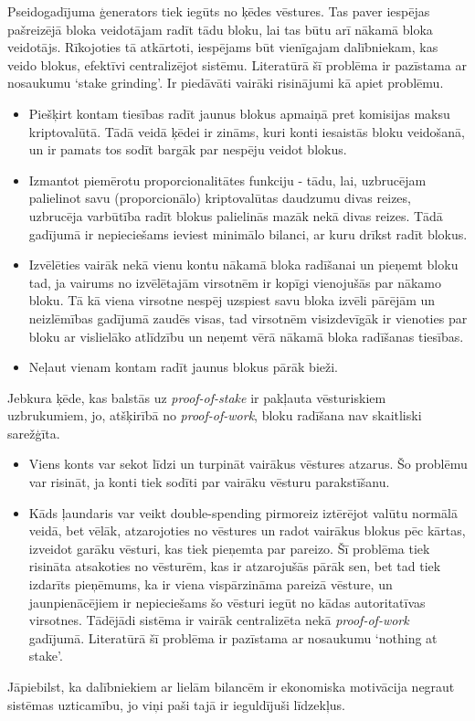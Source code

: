 Pseidogadījuma ģenerators tiek iegūts no ķēdes vēstures. Tas paver iespējas pašreizējā bloka veidotājam radīt tādu bloku, lai tas būtu arī nākamā bloka veidotājs. Rīkojoties tā atkārtoti, iespējams būt vienīgajam dalībniekam, kas veido blokus, efektīvi centralizējot sistēmu. Literatūrā šī problēma ir pazīstama ar nosaukumu `stake grinding'. Ir piedāvāti vairāki risinājumi kā apiet problēmu.\cite{popov16,dannen17}
\begin{itemize}
    \item Piešķirt kontam tiesības radīt jaunus blokus apmaiņā pret komisijas maksu kriptovalūtā. 
    Tādā veidā ķēdei ir zināms, kuri konti iesaistās bloku veidošanā, un ir pamats tos sodīt bargāk par nespēju veidot blokus.
    \item Izmantot piemērotu proporcionalitātes funkciju - tādu, lai, uzbrucējam palielinot savu (proporcionālo) kriptovalūtas daudzumu divas reizes, uzbrucēja varbūtība radīt blokus palielinās mazāk nekā divas reizes.\cite{popov16} Tādā gadījumā ir nepieciešams ieviest minimālo bilanci, ar kuru drīkst radīt blokus.
    \item Izvēlēties vairāk nekā vienu kontu nākamā bloka radīšanai un pieņemt bloku tad, ja vairums no izvēlētajām virsotnēm ir kopīgi vienojušās par nākamo bloku. Tā kā viena virsotne nespēj uzspiest savu bloka izvēli pārējām un neizlēmības gadījumā zaudēs visas, tad virsotnēm visizdevīgāk ir vienoties par bloku ar vislielāko atlīdzību un neņemt vērā nākamā bloka radīšanas tiesības.
    \item Neļaut vienam kontam radīt jaunus blokus pārāk bieži.
\end{itemize}

Jebkura ķēde, kas balstās uz \textit{proof-of-stake} ir pakļauta vēsturiskiem uzbrukumiem, jo, atšķirībā no \textit{proof-of-work}, bloku radīšana nav skaitliski sarežģīta.
\begin{itemize}
    \item Viens konts var sekot līdzi un turpināt vairākus vēstures atzarus. Šo problēmu var risināt, ja konti tiek sodīti par vairāku vēsturu parakstīšanu.
    \item Kāds ļaundaris var veikt double-spending pirmoreiz iztērējot valūtu normālā veidā, bet vēlāk, atzarojoties no vēstures un radot vairākus blokus pēc kārtas, izveidot garāku vēsturi, kas tiek pieņemta par pareizo. Šī problēma tiek risināta atsakoties no vēsturēm, kas ir atzarojušās pārāk sen, bet tad tiek izdarīts pieņēmums, ka ir viena vispārzināma pareizā vēsture, un jaunpienācējiem ir nepieciešams šo vēsturi iegūt no kādas autoritatīvas virsotnes. Tādējādi sistēma ir vairāk centralizēta nekā \textit{proof-of-work} gadījumā.\cite{poelstra15} Literatūrā šī problēma ir pazīstama ar nosaukumu `nothing at stake'.
\end{itemize}
Jāpiebilst, ka dalībniekiem ar lielām bilancēm ir ekonomiska motivācija negraut sistēmas uzticamību, jo viņi paši tajā ir ieguldījuši līdzekļus.

